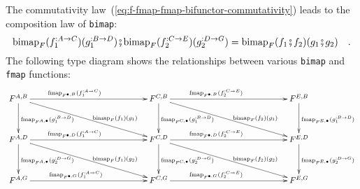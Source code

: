The commutativity law~(\ref{eq:f-fmap-fmap-bifunctor-commutativity})
leads to the composition law of \lstinline!bimap!:
\begin{equation}
\text{bimap}_{F}(f_{1}^{:A\rightarrow C})(g_{1}^{:B\rightarrow D})\bef\text{bimap}_{F}(f_{2}^{:C\rightarrow E})(g_{2}^{:D\rightarrow G})=\text{bimap}_{F}(f_{1}\bef f_{2})(g_{1}\bef g_{2})\quad.\label{eq:f-bimap-composition-law}
\end{equation}
The following type diagram shows the relationships between various
\lstinline!bimap! and \lstinline!fmap! functions:
\[
\xymatrix{\xyScaleY{3.0pc}\xyScaleX{12.0pc}F^{A,B}\ar[rd]\sp(0.6){~~~\text{bimap}_{F}(f_{1})(g_{1})}\ar[r]\sp(0.4){\text{fmap}_{F^{\bullet,B}}(f_{1}^{:A\rightarrow C})}\ar[d]\sp(0.5){\text{fmap}_{F^{A,\bullet}}(g_{1}^{:B\rightarrow D})} & F^{C,B}\ar[rd]\sp(0.6){~~~\text{bimap}_{F}(f_{2})(g_{1})}\ar[r]\sp(0.4){~\text{fmap}_{F^{\bullet,B}}(f_{2}^{:C\rightarrow E})}\ar[d]\sp(0.5){\text{fmap}_{F^{C,\bullet}}(g_{1}^{:B\rightarrow D})~~~} & F^{E,B}\ar[d]\sp(0.5){\text{fmap}_{F^{E,\bullet}}(g_{1}^{:B\rightarrow D})}\\
F^{A,D}\ar[rd]\sp(0.6){~~~\text{bimap}_{F}(f_{1})(g_{2})}\ar[r]\sp(0.4){\text{fmap}_{F^{\bullet,D}}(f_{1}^{:A\rightarrow C})}\ar[d]\sp(0.5){\text{fmap}_{F^{A,\bullet}}(g_{2}^{:D\rightarrow G})} & F^{C,D}\ar[rd]\sp(0.6){~~~\text{bimap}_{F}(f_{2})(g_{2})}\ar[r]\sp(0.4){~\text{fmap}_{F^{\bullet,D}}(f_{2}^{:C\rightarrow E})}\ar[d]\sp(0.5){\text{fmap}_{F^{C,\bullet}}(g_{2}^{:D\rightarrow G})~~~} & F^{E,D}\ar[d]\sp(0.5){\text{fmap}_{F^{E,\bullet}}(g_{2}^{:D\rightarrow G})}\\
F^{A,G}\ar[r]\sp(0.4){~\text{fmap}_{F^{\bullet,G}}(f_{1}^{:A\rightarrow C})} & F^{C,G}\ar[r]\sp(0.4){~\text{fmap}_{F^{\bullet,G}}(f_{2}^{:C\rightarrow E})} & F^{E,G}
}
\]

